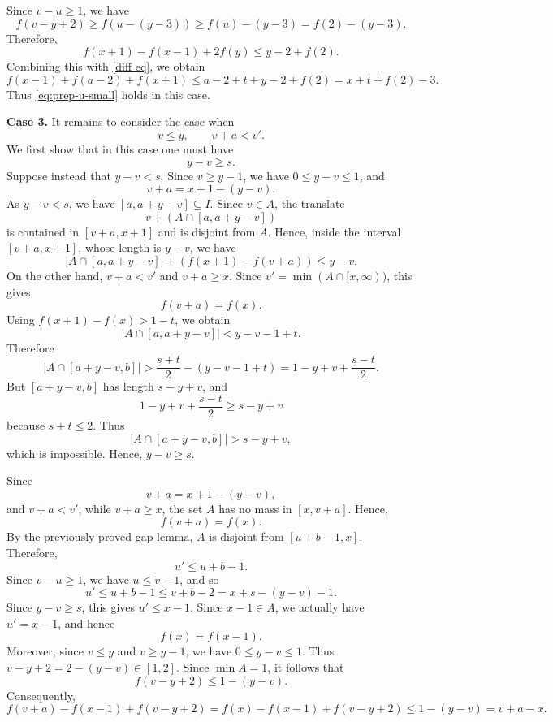 \documentclass[11pt,reqno]{amsart}
\theoremstyle{definition}
\def\F#1{f(#1)}
\begin{document}
    Since $v-u\geq1$, we have
    $$
        \F{v-y+2}\geq \F{u-(y-3)}\geq \F{u}-(y-3)=\F{2}-(y-3).
    $$
    Therefore,
    $$
        \F{x+1}-\F{x-1}+2\F{y}\leq y-2+\F{2}.
    $$
    Combining this with \eqref{diff eq}, we obtain
    $$
        \F{x-1}+\F{a-2}+\F{x+1}
        \leq
        a-2+t+y-2+\F{2}
        =
        x+t+\F{2}-3.
    $$
    Thus \eqref{eq:prep-u-small} holds in this case.
\medskip

\noindent\textbf{Case 3.} 
    It remains to consider the case when
    $$
        v\leq y,\qquad v+a<v'.
    $$
    We first show that in this case one must have
    $$
        y-v\geq s.
    $$
    Suppose instead that $y-v<s$. Since $v\geq y-1$, we have
    $0\leq y-v\leq1$, and
    $$
        v+a=x+1-(y-v).
    $$
    As $y-v<s$, we have $[a,a+y-v]\subseteq I$. Since $v\in A$, the translate
    $$
        v+(A\cap[a,a+y-v])
    $$
    is contained in $[v+a,x+1]$ and is disjoint from $A$. Hence, inside the
    interval $[v+a,x+1]$, whose length is $y-v$, we have
    $$
        |A\cap[a,a+y-v]|+(\F{x+1}-\F{v+a})\leq y-v.
    $$
    On the other hand, $v+a<v'$ and $v+a\geq x$. Since
    $v'=\min(A\cap[x,\infty))$, this gives
    $$
        \F{v+a}=\F{x}.
    $$
    Using $\F{x+1}-\F{x}>1-t$, we obtain
    $$
        |A\cap[a,a+y-v]|<y-v-1+t.
    $$
    Therefore
    $$
        |A\cap[a+y-v,b]|
        >
        \frac{s+t}{2}-(y-v-1+t)
        =
        1-y+v+\frac{s-t}{2}.
    $$
    But $[a+y-v,b]$ has length $s-y+v$, and
    $$
        1-y+v+\frac{s-t}{2}\geq s-y+v
    $$
    because $s+t\leq2$. Thus
    $$
        |A\cap[a+y-v,b]|>s-y+v,
    $$
    which is impossible. Hence,   $y-v\geq s$.

    Since
    $$
        v+a=x+1-(y-v),
    $$
    and $v+a<v'$, while $v+a\geq x$, the set $A$ has no mass in $[x,v+a]$.
    Hence,
    $$
        \F{v+a}=\F{x}.
    $$
    By the previously proved gap lemma, $A$ is disjoint from $[u+b-1,x]$.
    Therefore,
    $$
        u'\leq u+b-1.
    $$
    Since $v-u\geq1$, we have $u\leq v-1$, and so
    $$
        u'\leq u+b-1\leq v+b-2=x+s-(y-v)-1.
    $$
    Since $y-v\geq s$, this gives $u'\leq x-1$. Since $x-1\in A$, we actually
    have $u'=x-1$, and hence
    $$
        \F{x}=\F{x-1}.
    $$
   Moreover, since $v\leq y$ and $v\geq y-1$, we have $0\leq y-v\leq 1$.
Thus
$
    v-y+2=2-(y-v)\in[1,2].
$
Since $\min A=1$, it follows that
$$
    \F{v-y+2}\leq 1-(y-v).
$$
    Consequently,
    $$
        \F{v+a}-\F{x-1}+\F{v-y+2}
        =
        \F{x}-\F{x-1}+\F{v-y+2}
        \leq
        1-(y-v)
        =
        v+a-x.
    $$
\end{document}
